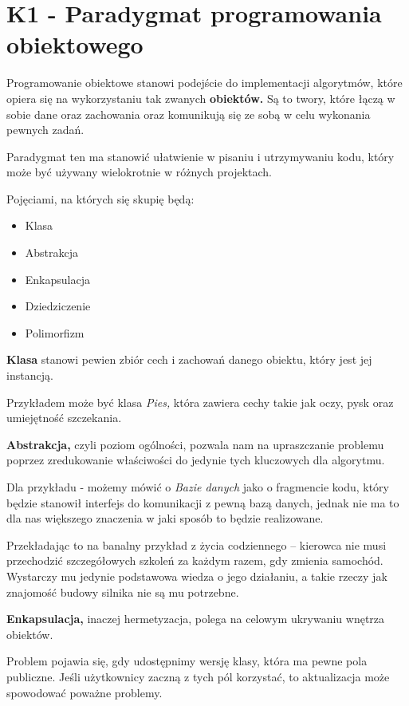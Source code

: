 \section{K1 - Paradygmat programowania obiektowego}

Programowanie obiektowe stanowi podejście do implementacji algorytmów, które opiera się na wykorzystaniu tak zwanych \textbf{obiektów.} Są to twory, które łączą w sobie dane oraz zachowania oraz komunikują się ze sobą w celu wykonania pewnych zadań.

Paradygmat ten ma stanowić ułatwienie w pisaniu i utrzymywaniu kodu, który może być używany wielokrotnie w różnych projektach.

Pojęciami, na których się skupię będą:
\begin{itemize}
	\item Klasa
	\item Abstrakcja
	\item Enkapsulacja
	\item Dziedziczenie
	\item Polimorfizm
\end{itemize}

\textbf{Klasa} stanowi pewien zbiór cech i zachowań danego obiektu, który jest jej instancją.

Przykładem może być klasa \textit{Pies,} która zawiera cechy takie jak oczy, pysk oraz umiejętność szczekania.

\textbf{Abstrakcja,} czyli poziom ogólności, pozwala nam na upraszczanie problemu poprzez zredukowanie właściwości do jedynie tych kluczowych dla algorytmu.

Dla przykładu - możemy mówić o \textit{Bazie danych} jako o fragmencie kodu, który będzie stanowił interfejs do komunikacji z pewną bazą danych, jednak nie ma to dla nas większego znaczenia w jaki sposób to będzie realizowane.

Przekładając to na banalny przykład z życia codziennego -- kierowca nie musi przechodzić szczegółowych szkoleń za każdym razem, gdy zmienia samochód.
Wystarczy mu jedynie podstawowa wiedza o jego działaniu, a takie rzeczy jak znajomość budowy silnika nie są mu potrzebne.

\textbf{Enkapsulacja,} inaczej hermetyzacja, polega na celowym ukrywaniu wnętrza obiektów.

Problem pojawia się, gdy udostępnimy wersję klasy, która ma pewne pola publiczne.
Jeśli użytkownicy zaczną z tych pól korzystać, to aktualizacja może spowodować poważne problemy.

